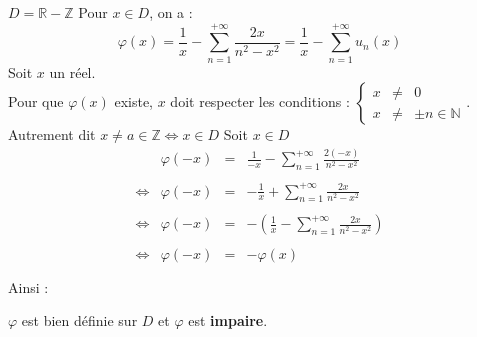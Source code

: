 $D = \mathbb{R} - \mathbb{Z}$ Pour $x \in D$, on a :
\[
  \varphi(x) = \frac{1}{x} - \sum_{n=1}^{+\infty} \frac{2x}{n^2-x^2} =  \frac{1}{x} - \sum_{n=1}^{+\infty} u_n(x)
\]
Soit $x$ un réel.\\
Pour que $\varphi(x)$ existe, $x$ doit respecter les conditions :
$
  \left\{
  \begin{array}{rcl}
    x & \neq & 0                    \\
    x & \neq & \pm n \in \mathbb{N}
  \end{array}
  \right.
$.\\Autrement dit $x\neq a \in \mathbb{Z} \iff x \in D$
Soit $x \in D$
\[
  \begin{array}{crcl}
         & \varphi(-x) & = & \frac{1}{-x} - \sum\limits_{n=1}^{+\infty} \frac{2(-x)}{n^2-x^2}           \\\\
    \iff & \varphi(-x) & = & -\frac{1}{x} + \sum\limits_{n=1}^{+\infty} \frac{2x}{n^2-x^2}              \\\\
    \iff & \varphi(-x) & = & -\left(\frac{1}{x} - \sum\limits_{n=1}^{+\infty} \frac{2x}{n^2-x^2}\right) \\\\
    \iff & \varphi(-x) & = & -\varphi(x)                                                                \\\\
  \end{array}
\]
Ainsi :
\begin{result}
  $\varphi$ est bien définie sur $D$ et $\varphi$ est \textbf{impaire}.
\end{result}
